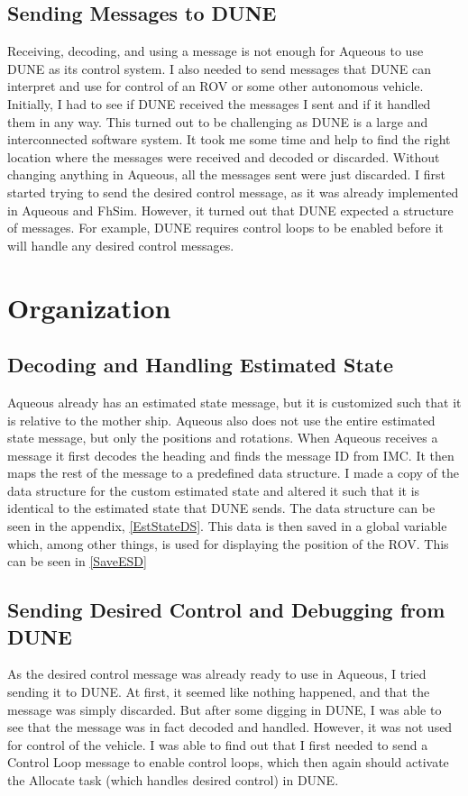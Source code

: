 \documentclass{article}
\begin{document}
\subsection{Sending Messages to DUNE}
Receiving, decoding, and using a message is not enough for Aqueous to use DUNE as its control system. 
I also needed to send messages that DUNE can interpret and use for control of an ROV or some other autonomous vehicle.
Initially, I had to see if DUNE received the messages I sent and if it handled them in any way.
This turned out to be challenging as DUNE is a large and interconnected software system. 
It took me some time and help to find the right location where the messages were received and decoded or discarded.
Without changing anything in Aqueous, all the messages sent were just discarded.
I first started trying to send the desired control message, as it was already implemented in Aqueous and FhSim.
However, it turned out that DUNE expected a structure of messages. For example, DUNE requires control loops to be enabled before it will handle any desired control messages.

\section{Organization}\label{org}
\subsection{Decoding and Handling Estimated State}
Aqueous already has an estimated state message, but it is customized such that it is relative to the mother ship.
Aqueous also does not use the entire estimated state message, but only the positions and rotations.
When Aqueous receives a message it first decodes the heading and finds the message ID from IMC. 
It then maps the rest of the message to a predefined data structure.
I made a copy of the data structure for the custom estimated state and altered it such that it is identical to the estimated state that DUNE sends.
The data structure can be seen in the appendix, \autoref{EstStateDS}.
This data is then saved in a global variable which, among other things, is used for displaying the position of the ROV.
This can be seen in \autoref{SaveESD}

\subsection{Sending Desired Control and Debugging from DUNE}
As the desired control message was already ready to use in Aqueous, I tried sending it to DUNE.
At first, it seemed like nothing happened, and that the message was simply discarded.
But after some digging in DUNE, I was able to see that the message was in fact decoded and handled.
However, it was not used for control of the vehicle. 
I was able to find out that I first needed to send a Control Loop message to enable control loops, 
which then again should activate the Allocate task (which handles desired control) in DUNE.
\end{document}

